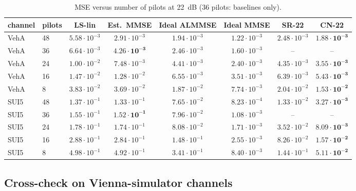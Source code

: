 \documentclass[10pt,a4paper]{article}
\begin{document}
\begin{table}[!htbp]
  \centering
  \caption{MSE versus number of pilots at 22~dB (36 pilots: baselines only).}
  \label{tab:pilots}
  \footnotesize
\begin{tabular}{llcccccc}
\toprule
channel & pilots & LS-lin & Est.\ MMSE & Ideal ALMMSE & Ideal MMSE & SR-22 & CN-22 \\
\midrule
VehA & 48 & $5.58\cdot10^{-3}$ & $2.91\cdot10^{-3}$ & $1.94\cdot10^{-3}$ & $1.22\cdot10^{-3}$ & $2.48\cdot10^{-3}$ & $\mathbf{1.88\cdot10^{-3}}$ \\
VehA & 36 & $6.64\cdot10^{-3}$ & $\mathbf{4.26\cdot10^{-3}}$ & $2.46\cdot10^{-3}$ & $1.60\cdot10^{-3}$ & -- & -- \\
VehA & 24 & $1.00\cdot10^{-2}$ & $7.48\cdot10^{-3}$ & $4.41\cdot10^{-3}$ & $2.40\cdot10^{-3}$ & $4.35\cdot10^{-3}$ & $\mathbf{3.55\cdot10^{-3}}$ \\
VehA & 16 & $1.47\cdot10^{-2}$ & $1.28\cdot10^{-2}$ & $6.55\cdot10^{-3}$ & $3.51\cdot10^{-3}$ & $6.39\cdot10^{-3}$ & $\mathbf{5.43\cdot10^{-3}}$ \\
VehA & 8 & $3.83\cdot10^{-2}$ & $3.69\cdot10^{-2}$ & $1.87\cdot10^{-2}$ & $7.74\cdot10^{-3}$ & $2.04\cdot10^{-2}$ & $\mathbf{1.53\cdot10^{-2}}$ \\
\midrule
SUI5 & 48 & $1.37\cdot10^{-1}$ & $1.33\cdot10^{-1}$ & $7.65\cdot10^{-2}$ & $8.23\cdot10^{-4}$ & $1.33\cdot10^{-2}$ & $\mathbf{3.27\cdot10^{-3}}$ \\
SUI5 & 36 & $1.55\cdot10^{-1}$ & $\mathbf{1.52\cdot10^{-1}}$ & $7.96\cdot10^{-2}$ & $1.08\cdot10^{-3}$ & -- & -- \\
SUI5 & 24 & $1.78\cdot10^{-1}$ & $1.74\cdot10^{-1}$ & $8.08\cdot10^{-2}$ & $1.71\cdot10^{-3}$ & $3.52\cdot10^{-2}$ & $\mathbf{8.09\cdot10^{-3}}$ \\
SUI5 & 16 & $2.88\cdot10^{-1}$ & $2.84\cdot10^{-1}$ & $1.48\cdot10^{-1}$ & $2.55\cdot10^{-3}$ & $8.26\cdot10^{-2}$ & $\mathbf{1.57\cdot10^{-2}}$ \\
SUI5 & 8 & $4.98\cdot10^{-1}$ & $4.92\cdot10^{-1}$ & $3.41\cdot10^{-1}$ & $8.40\cdot10^{-3}$ & $1.44\cdot10^{-1}$ & $\mathbf{5.11\cdot10^{-2}}$ \\
\bottomrule
\end{tabular}
\end{table}

\subsection{Cross-check on Vienna-simulator channels}
\label{sec:vienna}
\end{document}
